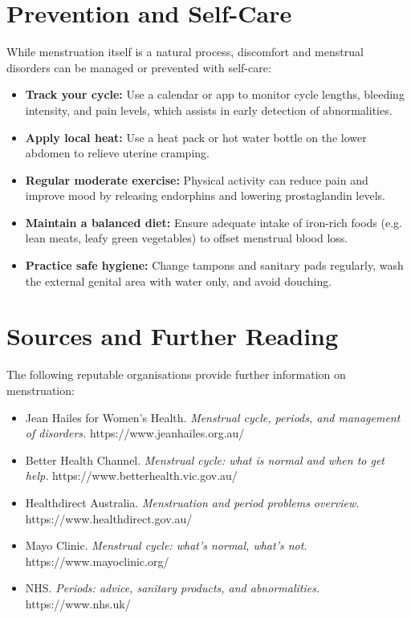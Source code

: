 \section*{Prevention and Self-Care}
While menstruation itself is a natural process, discomfort and menstrual disorders can be managed or prevented with self-care:
\begin{itemize}
    \item \textbf{Track your cycle:} Use a calendar or app to monitor cycle lengths, bleeding intensity, and pain levels, which assists in early detection of abnormalities.
    \item \textbf{Apply local heat:} Use a heat pack or hot water bottle on the lower abdomen to relieve uterine cramping.
    \item \textbf{Regular moderate exercise:} Physical activity can reduce pain and improve mood by releasing endorphins and lowering prostaglandin levels.
    \item \textbf{Maintain a balanced diet:} Ensure adequate intake of iron-rich foods (e.g. lean meats, leafy green vegetables) to offset menstrual blood loss.
    \item \textbf{Practice safe hygiene:} Change tampons and sanitary pads regularly, wash the external genital area with water only, and avoid douching.
\end{itemize}

\section*{Sources and Further Reading}
The following reputable organisations provide further information on menstruation:
\begin{itemize}
    \item Jean Hailes for Women's Health. \textit{Menstrual cycle, periods, and management of disorders.} https://www.jeanhailes.org.au/
    \item Better Health Channel. \textit{Menstrual cycle: what is normal and when to get help.} https://www.betterhealth.vic.gov.au/
    \item Healthdirect Australia. \textit{Menstruation and period problems overview.} https://www.healthdirect.gov.au/
    \item Mayo Clinic. \textit{Menstrual cycle: what's normal, what's not.} https://www.mayoclinic.org/
    \item NHS. \textit{Periods: advice, sanitary products, and abnormalities.} https://www.nhs.uk/
\end{itemize}

